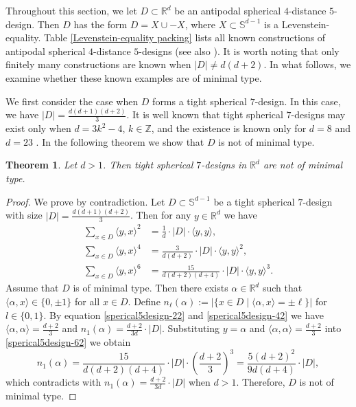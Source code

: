 \documentclass[11pt]{article}
\newtheorem{theorem}{Theorem}[section]
\theoremstyle{definition}
\theoremstyle{remark}
\begin{document}
Throughout this section, we let $D\subset\mathbb{R}^d$ be an antipodal spherical $4$-distance $5$-design.
Then $D$ has the form $D=X\cup -X$, where $X\subset\mathbb{S}^{d-1}$ is a Levenstein-equality. 
Table \ref{Levenstein-equality packing} lists all known constructions of antipodal spherical $4$-distance $5$-designs (see also \cite{Haas,Mun06}).
It is worth noting that only finitely many constructions are known when $|D|\neq d(d+2)$.
In what follows, we examine whether these known examples are of minimal type.

We first consider the case when $D$ forms a tight spherical $7$-design. 
In this case, we have $|D|=\frac{d(d+1)(d+2)}{3}$.
It is well known that tight spherical $7$-designs may exist only when $d=3k^2-4$, $k\in\mathbb{Z}$, and the existence is known only for $d=8$ and $d=23$ \cite{BMV04,BB09b}. 
In the following theorem we show that $D$ is not of minimal type.

\begin{theorem}\label{tight7design}
Let $d>1$.
Then tight spherical $7$-designs in $\mathbb{R}^d$ are not of minimal type.
	
\end{theorem}

\begin{proof}
We prove by contradiction.
Let  $D\subset\mathbb{S}^{d-1}$ be a tight spherical $7$-design with size $|D|=\frac{d(d+1)(d+2)}{3}$. Then for any $y\in\mathbb{R}^d$ we have \cite{BMV04}
\begin{subequations}
\begin{align}
\sum_{x\in D}\langle y,x \rangle^2&=\frac{1}{d}\cdot |D|\cdot \langle y,y \rangle,\label{sperical5design-22} \\
\sum_{x\in D}\langle y,x \rangle^4&=\frac{3}{d(d+2)}\cdot |D|\cdot\langle y,y \rangle^2,\label{sperical5design-42}\\
\sum_{x\in D}\langle y,x \rangle^6&=\frac{15}{d(d+2)(d+4)}\cdot |D|\cdot\langle y,y \rangle^3.\label{sperical5design-62}
\end{align}
\end{subequations}
Assume that $D$ is of minimal type. 
Then there exists $\alpha\in\mathbb{R}^d$  
such that $\langle  \alpha, x\rangle\in \{0,\pm1\}$ for all $x\in D$. Define $n_\ell(\alpha):=|\{x\in D \mid \langle \alpha,x\rangle=\pm \ell\}|$ for $l\in\{0,1\}$.
By equation \eqref{sperical5design-22} and \eqref{sperical5design-42} we have $\langle \alpha,\alpha\rangle=\frac{d+2}{3}$ and $n_1( \alpha)=\frac{d+2}{3d}\cdot |D|$.
Substituting $y=\alpha$ and $\langle \alpha,\alpha\rangle=\frac{d+2}{3}$ into \eqref{sperical5design-62} we obtain
\begin{equation*}
n_1(\alpha)=\frac{15}{d(d+2)(d+4)}\cdot |D|\cdot(\frac{d+2}{3})^3	=\frac{5(d+2)^2}{9d(d+4)}\cdot |D|,
\end{equation*}
which contradicts with $n_1( \alpha)=\frac{d+2}{3d}\cdot |D|$ when $d>1$. 
Therefore, $D$ is not of minimal type.
	
\end{proof}
\end{document}
